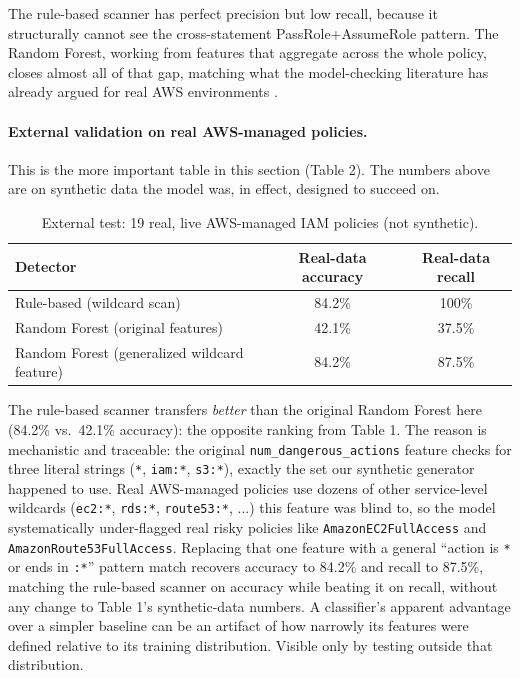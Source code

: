 \documentclass[11pt,a4paper]{article}
\begin{document}
The rule-based scanner has perfect precision but low recall, because it structurally cannot see the cross-statement PassRole+AssumeRole pattern. The Random Forest, working from features that aggregate across the whole policy, closes almost all of that gap, matching what the model-checking literature has already argued for real AWS environments \cite{shevrin2023}.

\paragraph{External validation on real AWS-managed policies.} This is the more important table in this section (Table 2). The numbers above are on synthetic data the model was, in effect, designed to succeed on.

\begin{table}[h]
\centering
\begin{tabular}{@{}lcc@{}}
\toprule
Detector & Real-data accuracy & Real-data recall \\
\midrule
Rule-based (wildcard scan) & 84.2\% & 100\% \\
Random Forest (original features) & 42.1\% & 37.5\% \\
Random Forest (generalized wildcard feature) & 84.2\% & 87.5\% \\
\bottomrule
\end{tabular}
\caption{External test: 19 real, live AWS-managed IAM policies (not synthetic).}
\end{table}

The rule-based scanner transfers \emph{better} than the original Random Forest here (84.2\% vs.\ 42.1\% accuracy): the opposite ranking from Table 1. The reason is mechanistic and traceable: the original \texttt{num\_dangerous\_actions} feature checks for three literal strings (\texttt{*}, \texttt{iam:*}, \texttt{s3:*}), exactly the set our synthetic generator happened to use. Real AWS-managed policies use dozens of other service-level wildcards (\texttt{ec2:*}, \texttt{rds:*}, \texttt{route53:*}, ...) this feature was blind to, so the model systematically under-flagged real risky policies like \texttt{AmazonEC2FullAccess} and \texttt{AmazonRoute53FullAccess}. Replacing that one feature with a general ``action is \texttt{*} or ends in \texttt{:*}'' pattern match recovers accuracy to 84.2\% and recall to 87.5\%, matching the rule-based scanner on accuracy while beating it on recall, without any change to Table 1's synthetic-data numbers. A classifier's apparent advantage over a simpler baseline can be an artifact of how narrowly its features were defined relative to its training distribution. Visible only by testing outside that distribution.
\end{document}
